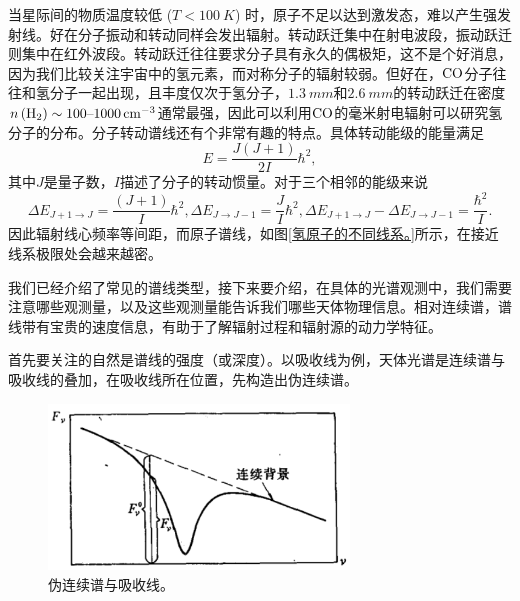 \documentclass[../天体物理基础.tex]{subfiles}
\begin{document}
当星际间的物质温度较低 ($T<\qty{100}{K}$) 时，原子不足以达到激发态，难以产生强发射线。好在分子振动和转动同样会发出辐射。转动跃迁集中在射电波段，振动跃迁则集中在红外波段。转动跃迁往往要求分子具有永久的偶极矩，这不是个好消息，因为我们比较关注宇宙中的氢元素，而对称分子的辐射较弱。但好在，$\ce{CO}$分子往往和氢分子一起出现，且丰度仅次于氢分子，$\qty{1.3}{mm}$和$\qty{2.6}{mm}$的转动跃迁在密度$n\left(\ce{^{}H2}\right)\sim100\text{\textendash}1000\,\unit{cm^{-3}}$通常最强，因此可以利用$\ce{CO}$的毫米射电辐射可以研究氢分子的分布。分子转动谱线还有个非常有趣的特点。具体转动能级的能量满足
\begin{equation}
E=\frac{J(J+1)}{2I}\hbar^{2},
\end{equation}
其中$J$是量子数，$I$描述了分子的转动惯量。对于三个相邻的能级来说
\begin{equation}
\Delta{}E_{J+1\to J}=\frac{\left(J+1\right)}{I}\hbar^{2},\Delta{}E_{J\to J-1}=\frac{J}{I}\hbar^{2},\Delta{}E_{J+1\to J}-\Delta{}E_{J\to J-1}=\frac{\hbar^{2}}{I}.
\end{equation}
因此辐射线心频率等间距，而原子谱线，如图\ref{氢原子的不同线系。}所示，在接近线系极限处会越来越密。

我们已经介绍了常见的谱线类型，接下来要介绍，在具体的光谱观测中，我们需要注意哪些观测量，以及这些观测量能告诉我们哪些天体物理信息。相对连续谱，谱线带有宝贵的速度信息，有助于了解辐射过程和辐射源的动力学特征。

首先要关注的自然是谱线的强度（或深度）。以吸收线为例，天体光谱是连续谱与吸收线的叠加，在吸收线所在位置，先构造出伪连续谱。
\begin{figure}[!htbp]
\centering
\includegraphics[width=8cm]{figures/figure1_13.png}
\captionsetup{justification=raggedright, singlelinecheck=false}
\caption{伪连续谱与吸收线。}
\label{伪连续谱与吸收线。}
\end{figure}
\end{document}
